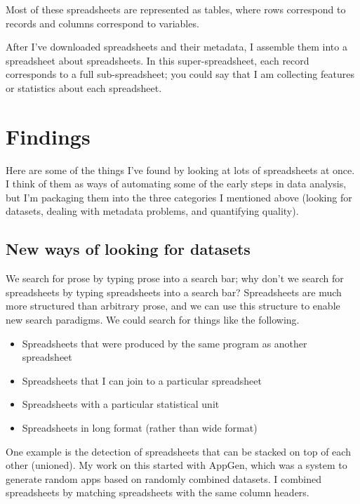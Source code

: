 \documentclass{acm_proc_article-sp}
\begin{document}
Most of these spreadsheets are represented as tables,
where rows correspond to records and columns correspond to variables. \cite{table}

After I've downloaded spreadsheets and their metadata,
I assemble them into a spreadsheet about spreadsheets. \cite{data-driven}
In this super-spreadsheet, each record corresponds to a full
sub-spreadsheet; you could say that I am collecting features or statistics
about each spreadsheet.

\section{Findings}
Here are some of the things I've found by looking at lots of spreadsheets at
once. I think of them as ways of automating some of the early steps in data
analysis, but I'm packaging them into the three categories I mentioned above
(looking for datasets, dealing with metadata problems, and quantifying quality).

\subsection{New ways of looking for datasets}
We search for prose by typing prose into a search bar; why don't
we search for spreadsheets by typing spreadsheets into a search bar?
Spreadsheets are much more structured than arbitrary prose, and we
can use this structure to enable new search paradigms. We could search
for things like the following.

\begin{itemize}
\item Spreadsheets that were produced by the same program as another spreadsheet
\item Spreadsheets that I can join to a particular spreadsheet
\item Spreadsheets with a particular statistical unit
\item Spreadsheets in long format (rather than wide format)
\end{itemize}

One example is the detection of spreadsheets that can be stacked on top of
each other (unioned).
My work on this started with AppGen,\cite{appgen} which was a system to
generate random apps based on randomly combined datasets. I combined spreadsheets
by matching spreadsheets with the same column headers.
\end{document}

